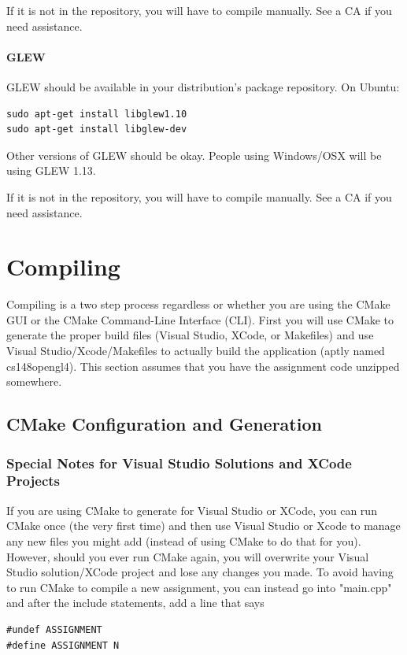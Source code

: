 \documentclass{article}
\begin{document}
If it is not in the repository, you will have to compile manually. See a CA if you need assistance.

\paragraph{\textbf{GLEW}}

GLEW should be available in your distribution's package repository. On Ubuntu:

\begin{lstlisting}
sudo apt-get install libglew1.10
sudo apt-get install libglew-dev
\end{lstlisting}

Other versions of GLEW should be okay. People using Windows/OSX will be using GLEW 1.13.

If it is not in the repository, you will have to compile manually. See a CA if you need assistance.

\section*{Compiling}

Compiling is a two step process regardless or whether you are using the CMake GUI or the CMake Command-Line Interface (CLI). First you will use CMake to generate the proper build files (Visual Studio, XCode, or Makefiles) and use Visual Studio/Xcode/Makefiles to actually build the application (aptly named cs148opengl4). This section assumes that you have the assignment code unzipped somewhere. 

\subsection*{CMake Configuration and Generation}

\subsubsection*{Special Notes for Visual Studio Solutions and XCode Projects}

If you are using CMake to generate for Visual Studio or XCode, you can run CMake once (the very first time) and then use Visual Studio or Xcode to manage any new files you might add (instead of using CMake to do that for you). However, should you ever run CMake again, you will overwrite your Visual Studio solution/XCode project and lose any changes you made. To avoid having to run CMake to compile a new assignment, you can instead go into "main.cpp" and after the include statements, add a line that says 
\begin{lstlisting}
#undef ASSIGNMENT
#define ASSIGNMENT N
\end{lstlisting}
\end{document}
